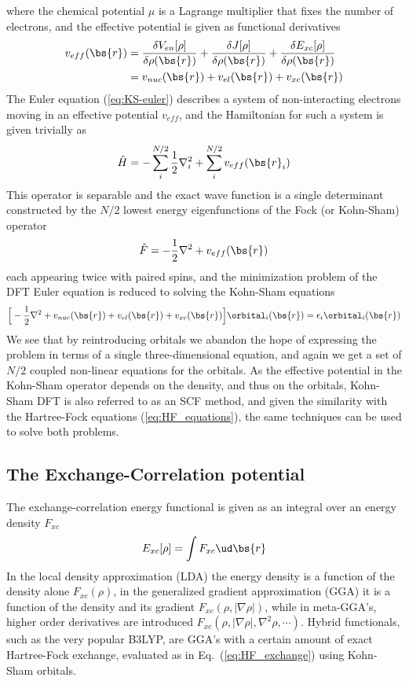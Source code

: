 where the chemical potential $\mu$ is a Lagrange multiplier that fixes the number of 
electrons, and the effective potential is given as functional derivatives
\begin{align}
    v_{eff}(\bs{r}) 
	&= \frac{\delta V_{en}[\rho]}{\delta \rho(\bs{r})}
	+ \frac{\delta J[\rho]}{\delta \rho(\bs{r})}
	+ \frac{\delta E_{xc}[\rho]}{\delta \rho(\bs{r})}\\
	\label{eq:effective_pot}
	&= v_{nuc}(\bs{r}) + v_{el}(\bs{r}) + v_{xc}(\bs{r})
\end{align}
The Euler equation (\ref{eq:KS-euler}) describes a system of non-interacting electrons moving in an 
effective potential $v_{eff}$, and the Hamiltonian for such a system is given trivially as
\begin{equation}
    \hat{H} = -\sum_i^{N/2} \frac{1}{2}\nabla_i^2 + \sum_i^{N/2} v_{eff}(\bs{r}_i)
\end{equation}
This operator is separable and the exact wave function is a single determinant constructed 
by the $N/2$ lowest energy eigenfunctions of the Fock (or Kohn-Sham) operator
\begin{equation}
    \hat{F} = -\frac{1}{2}\nabla^2 + v_{eff}(\bs{r})
\end{equation}
each appearing twice with paired spins, and the minimization problem of the DFT Euler equation is 
reduced to solving the Kohn-Sham equations
\begin{equation}
    \label{eq:KS_equations}
    \Big[-\frac{1}{2}\nabla^2 + v_{nuc}(\bs{r}) + v_{el}(\bs{r}) + v_{xc}(\bs{r})\Big] 
	\orbital_i(\bs{r}) = \epsilon_i \orbital_i(\bs{r})
\end{equation}
We see that by reintroducing orbitals we abandon the hope of expressing the problem in terms of
a single three-dimensional equation, and again we get a set of $N/2$ coupled non-linear equations 
for the orbitals. As the effective potential in the Kohn-Sham operator depends on the density, 
and thus on the orbitals, Kohn-Sham DFT is also referred to as an SCF method, and given 
the similarity with the Hartree-Fock equations (\ref{eq:HF_equations}), the same techniques 
can be used to solve both problems. 

\subsection{The Exchange-Correlation potential}
The exchange-correlation energy functional is given as an integral over an energy
density $F_{xc}$
\begin{equation}
    E_{xc}[\rho] = \int F_{xc}\ud \bs{r}
\end{equation}
In the local density approximation (LDA) the energy density is a function of the density 
alone $F_{xc}(\rho)$, in the generalized gradient approximation (GGA) it is a function of
the density and its gradient $F_{xc}(\rho, |\nabla\rho|)$, while in meta-GGA's, higher order 
derivatives are introduced $F_{xc}(\rho, |\nabla\rho|, \nabla^2\rho, \cdots)$. Hybrid 
functionals, such as the very popular B3LYP\cite{B3LYP}, are GGA's with a certain amount of
exact Hartree-Fock exchange, evaluated as in Eq.~(\ref{eq:HF_exchange}) using Kohn-Sham orbitals.

